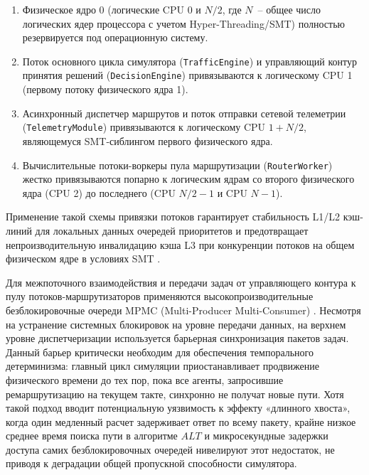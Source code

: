 \begin{enumerate}
    \item Физическое ядро 0 (логические CPU 0 и $N/2$, где $N$~-- общее число логических ядер процессора с учетом Hyper-Threading/SMT) полностью резервируется под операционную систему.
    \item Поток основного цикла симулятора (\texttt{TrafficEngine}) и управляющий контур принятия решений (\texttt{DecisionEngine}) привязываются к логическому CPU 1 (первому потоку физического ядра 1).
    \item Асинхронный диспетчер маршрутов и поток отправки сетевой телеметрии (\texttt{TelemetryModule}) привязываются к логическому CPU $1 + N/2$, являющемуся SMT-сиблингом первого физического ядра.
    \item Вычислительные потоки-воркеры пула маршрутизации (\texttt{RouterWorker}) жестко привязываются попарно к логическим ядрам со второго физического ядра (CPU 2) до последнего (CPU $N/2 - 1$ и CPU $N - 1$).
\end{enumerate}

Применение такой схемы привязки потоков гарантирует стабильность L1/L2 кэш-линий для локальных данных очередей приоритетов и предотвращает непроизводительную инвалидацию кэша L3 при конкуренции потоков на общем физическом ядре в условиях SMT \cite{evtikhov2020hpc}.

Для межпоточного взаимодействия и передачи задач от управляющего контура к пулу потоков-маршрутизаторов применяются высокопроизводительные безблокировочные очереди MPMC (Multi-Producer Multi-Consumer) \cite{desrochers2015concurrentqueue}. Несмотря на устранение системных блокировок на уровне передачи данных, на верхнем уровне диспетчеризации используется барьерная синхронизация пакетов задач. Данный барьер критически необходим для обеспечения темпорального детерминизма: главный цикл симуляции приостанавливает продвижение физического времени до тех пор, пока все агенты, запросившие ремаршрутизацию на текущем такте, синхронно не получат новые пути. Хотя такой подход вводит потенциальную уязвимость к эффекту «длинного хвоста», когда один медленный расчет задерживает ответ по всему пакету, крайне низкое среднее время поиска пути в алгоритме $ALT$ и микросекундные задержки доступа самих безблокировочных очередей нивелируют этот недостаток, не приводя к деградации общей пропускной способности симулятора.
